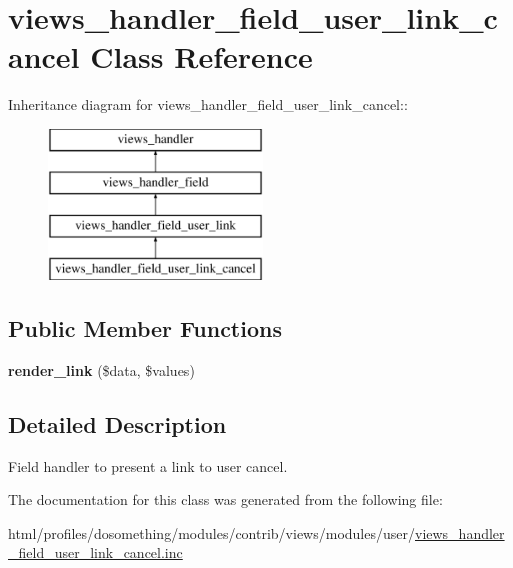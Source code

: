 \hypertarget{classviews__handler__field__user__link__cancel}{
\section{views\_\-handler\_\-field\_\-user\_\-link\_\-cancel Class Reference}
\label{classviews__handler__field__user__link__cancel}
}
Inheritance diagram for views\_\-handler\_\-field\_\-user\_\-link\_\-cancel::\begin{figure}[H]
\begin{center}
\leavevmode
\includegraphics[height=4cm]{classviews__handler__field__user__link__cancel}
\end{center}
\end{figure}
\subsection*{Public Member Functions}
\begin{DoxyCompactItemize}
\item 
\hypertarget{classviews__handler__field__user__link__cancel_ad506ec19502b47357d4b9ea81ff6c154}{
{\bfseries render\_\-link} (\$data, \$values)}
\label{classviews__handler__field__user__link__cancel_ad506ec19502b47357d4b9ea81ff6c154}

\end{DoxyCompactItemize}


\subsection{Detailed Description}
Field handler to present a link to user cancel. 

The documentation for this class was generated from the following file:\begin{DoxyCompactItemize}
\item 
html/profiles/dosomething/modules/contrib/views/modules/user/\hyperlink{views__handler__field__user__link__cancel_8inc}{views\_\-handler\_\-field\_\-user\_\-link\_\-cancel.inc}\end{DoxyCompactItemize}
